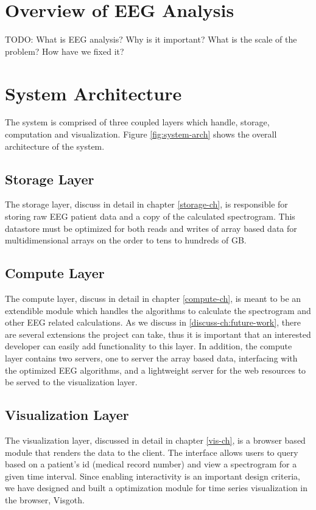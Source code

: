 \section{Overview of EEG Analysis}

TODO:
What is EEG analysis? Why is it important? What is the scale of the problem? How have we fixed it?

\section{System Architecture}

The system is comprised of three coupled layers which handle, storage,
computation and visualization. Figure \ref{fig:system-arch} shows the overall
architecture of the system.

\subsection{Storage Layer}

The storage layer, discuss in detail in chapter \ref{storage-ch}, is responsible for
storing raw EEG patient data and a copy of the calculated spectrogram. This
datastore must be optimized for both reads and writes of array based data for
multidimensional arrays on the order to tens to hundreds of GB.

\subsection{Compute Layer}

The compute layer, discuss in detail in chapter \ref{compute-ch}, is meant to be an
extendible module which handles the algorithms to calculate the spectrogram and
other EEG related calculations. As we discuss in \ref{discuss-ch:future-work},
there are several extensions the project can take, thus it is important that an
interested developer can easily add functionality to this layer. In addition,
the compute layer contains two servers, one to server the array based data,
interfacing with the optimized EEG algorithms, and a lightweight server for the
web resources to be served to the visualization layer.

\subsection{Visualization Layer}

The visualization layer, discussed in detail in chapter \ref{vis-ch}, is a browser
based module that renders the data to the client. The interface allows users to
query based on a patient's id (medical record number) and view a spectrogram
for a given time interval. Since enabling interactivity is an important design
criteria, we have designed and built a optimization module for time series
visualization in the browser, Visgoth.

